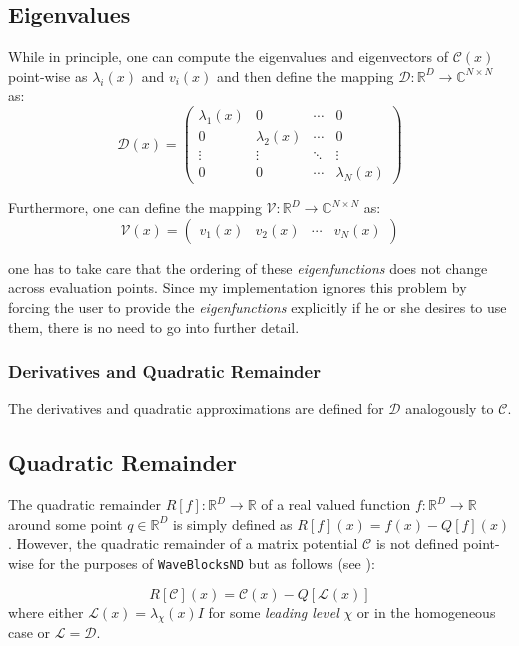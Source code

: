 \subsection{Eigenvalues}
While in principle, one can compute the eigenvalues and eigenvectors of $\mathcal{C}(x)$ point-wise as $\lambda_i(x)$ and $v_i(x)$ and then define the mapping
$\mathcal{D} : \mathbb{R}^D \rightarrow \mathbb{C}^{N\times N}$ as:
\begin{equation}
\mathcal{D}(x) = \begin{pmatrix}
  \lambda_1(x) & 0 & \cdots & 0 \\
  0& \lambda_2(x) & \cdots & 0 \\
  \vdots  & \vdots  & \ddots & \vdots  \\
  0 & 0 & \cdots & \lambda_N(x)
 \end{pmatrix}
 \label{eqn:diag}
\end{equation}

Furthermore, one can define the mapping $\mathcal{V} : \mathbb{R}^D \rightarrow \mathbb{C}^{N \times N}$ as:
\begin{equation}
\mathcal{V}(x) = \begin{pmatrix}
  v_1(x) & v_2(x) & \cdots & v_N(x)
 \end{pmatrix}
 \label{eqn:eigenTransform}
\end{equation}

one has to take care that the ordering of these \textit{eigenfunctions} does not change across evaluation points.
Since my implementation ignores this problem by forcing the user to provide the \textit{eigenfunctions} explicitly if he or she desires to use them, there is no need to go into further detail.

\subsubsection{Derivatives and Quadratic Remainder}
The derivatives and quadratic approximations are defined for $\mathcal{D}$ analogously to $\mathcal{C}$.

\subsection{Quadratic Remainder}
The quadratic remainder $R[f]: \mathbb{R}^D \rightarrow \mathbb{R}$ of a real valued function $f: \mathbb{R}^D \rightarrow \mathbb{R}$ around some point $q \in \mathbb{R}^D$ is simply defined as $R[f](x) = f(x) - Q[f](x)$.
However, the quadratic remainder of a matrix potential $\mathcal{C}$ is not defined point-wise for the purposes of \texttt{WaveBlocksND} but as follows (see \cite{B_master_thesis}):

\begin{equation}
R[\mathcal{C}](x) = \mathcal{C}(x) - Q[\mathcal{L}(x)]
\label{eqn:quadRemainder}
\end{equation}
where either $\mathcal{L}(x) = \lambda_\chi(x)I$ for some \textit{leading level} $\chi$ or in the homogeneous case or $\mathcal{L} = \mathcal{D}$.


